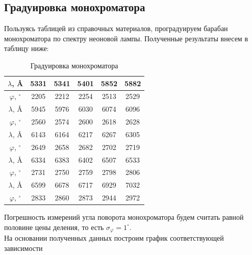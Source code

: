 \documentclass[a4paper,12pt]{extarticle}
\begin{document}
\subsection*{Градуировка монохроматора}
Пользуясь таблицей из справочных материалов, проградуируем барабан монохроматора по спектру неоновой лампы. Полученные результаты внесем в таблицу ниже:
\begin{table}[H]
    \centering
    \begin{tabular}{|c|c|c|c|c|c|}
    \hline
    $\lambda$, \AA & 5331 & 5341 & 5401 & 5852 & 5882 \\
    \hline
    $\varphi$, $^{\circ}$ & 2205 & 2212 & 2254 & 2513 & 2529 \\
    \hline
    $\lambda$, \AA & 5945 & 5976 & 6030 & 6074 & 6096 \\
    \hline
    $\varphi$, $^{\circ}$ & 2560 & 2574 & 2600 & 2618 & 2628 \\
    \hline
    $\lambda$, \AA & 6143 & 6164 & 6217 & 6267 & 6305 \\
    \hline
    $\varphi$, $^{\circ}$ & 2649 & 2658 & 2682 & 2702 & 2719 \\
    \hline
    $\lambda$, \AA & 6334 & 6383 & 6402 & 6507 & 6533 \\
    \hline
    $\varphi$, $^{\circ}$ & 2731 & 2750 & 2759 & 2798 & 2806 \\
    \hline
    $\lambda$, \AA & 6599 & 6678 & 6717 & 6929 & 7032 \\
    \hline
    $\varphi$, $^{\circ}$ & 2833 & 2860 & 2873 & 2944 & 2972 \\
    \hline
    \end{tabular}
    \caption{Градуировка монохроматора}
\end{table}
Погрешность измерений угла поворота монохроматора будем считать равной половине цены деления, то есть $\sigma_{\varphi} = 1^{\circ}$.\\
На основании полученных данных построим график соответствующей зависимости

\begin{minipage}{1\textwidth}
    \end{minipage}
    
\end{document}
